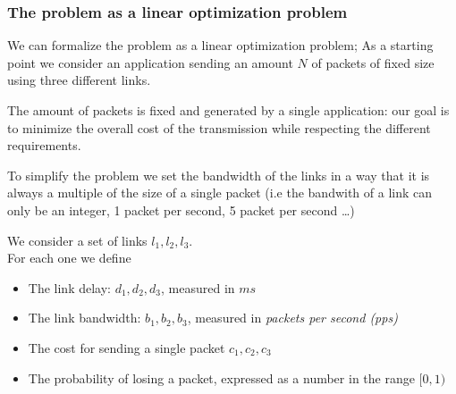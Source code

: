 \documentclass{article}
\begin{document}


\subsubsection{The problem as a linear optimization problem}

We can formalize the problem as a linear optimization problem;
As a starting point we consider an application sending an amount $N$ of packets of fixed size using three different links.

The amount of packets is fixed and generated by a single application: our goal is to minimize the overall cost of the transmission while respecting the different requirements.

To simplify the problem we set the bandwidth of the links in a way that it is always a multiple of the size of a single packet (i.e the bandwith of a link can only be an integer, 1 packet per second, 5 packet per second \dots)


We consider a set of links $l_1, l_2, l_3$. \\

For each one we define
\begin{itemize}
	\item The link delay:  $d_1, d_2, d_3$, measured in $ms$
	\item The link bandwidth: $b_1, b_2, b_3$, measured in \textit{packets per second (pps)}
	\item The cost for sending a single packet $c_1, c_2, c_3$
	\item The probability of losing a packet, expressed as a number in the range $ [0, 1)$
\end{itemize}
\end{document}
